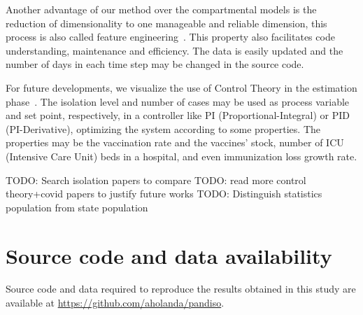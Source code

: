 \documentclass[review]{elsarticle}
\begin{document}
Another advantage of our method over the compartmental models is the 
 reduction of dimensionality to one manageable and reliable dimension, 
this process is also called feature engineering~\cite{Spieg2019}. 
This property also facilitates code understanding, maintenance and efficiency. 
The data is easily updated and the number of days in each time step 
may be changed in the source code.

For future developments, we visualize the use of Control Theory 
in the estimation phase~\cite{Stewart2020}. 
The isolation level and number of cases 
may be used as process variable and set point, respectively, 
in a controller like PI (Proportional-Integral) or PID (PI-Derivative), 
optimizing the system according to some properties. 
The properties may be the vaccination rate and the vaccines’ stock, 
number of ICU (Intensive Care Unit) beds in a hospital, 
and even immunization loss growth rate.

TODO: Search isolation papers to compare
TODO: read more control theory+covid papers to justify future works
TODO: Distinguish statistics population from state population

\section{Source code and data availability}
Source code and data required to reproduce the results 
obtained in this study are available at
\url{https://github.com/aholanda/pandiso}.


\end{document}
